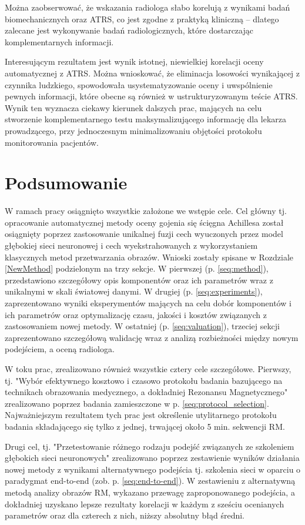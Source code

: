 Można zaobserwować, że wskazania radiologa słabo korelują z wynikami badań biomechanicznych oraz ATRS, co jest zgodne z praktyką kliniczną -- dlatego zalecane jest wykonywanie badań radiologicznych, które dostarczając komplementarnych informacji.

Interesującym rezultatem jest wynik istotnej, niewielkiej korelacji oceny automatycznej z ATRS. Można wnioskować, że eliminacja losowości wynikającej z czynnika ludzkiego, spowodowała usystematyzowanie oceny i uwspólnienie pewnych informacji, które obecne są również w ustrukturyzowanym teście ATRS. Wynik ten wyznacza ciekawy kierunek dalszych prac, mających na celu stworzenie komplementarnego testu maksymalizującego informację dla lekarza prowadzącego, przy jednoczesnym minimalizowaniu objętości protokołu monitorowania pacjentów.

\chapter{Podsumowanie}

W ramach pracy osiągnięto wszystkie założone we wstępie cele. Cel główny tj. opracowanie automatycznej metody oceny gojenia się ścięgna Achillesa został osiągnięty poprzez zastosowanie unikalnej fuzji cech wyuczonych przez model głębokiej sieci neuronowej i cech wyekstrahowanych z wykorzystaniem klasycznych metod przetwarzania obrazów. Wnioski zostały spisane w Rozdziale \ref{NewMethod} podzielonym na trzy sekcje. W pierwszej (p. \ref{seq:method}), przedstawiono szczegółowy opis komponentów oraz ich parametrów wraz z unikalnymi w skali światowej danymi. W drugiej (p. \ref{seq:experiments}), zaprezentowano wyniki eksperymentów mających na celu dobór komponentów i ich parametrów oraz optymalizację czasu, jakości i kosztów związanych z zastosowaniem nowej metody. W ostatniej (p. \ref{seq:valuation}), trzeciej sekcji zaprezentowano szczegółową walidację wraz z analizą rozbieżności między nowym podejściem, a oceną radiologa.

W toku prac, zrealizowano również wszystkie cztery cele szczegółowe. Pierwszy, tj. "Wybór efektywnego kosztowo i czasowo protokołu badania bazującego na technikach obrazowania medycznego, a dokładniej Rezonansu Magnetycznego" zrealizowano poprzez badania zamieszczone w p. \ref{seq:protocol_selection}. Najważniejszym rezultatem tych prac jest określenie utylitarnego protokołu badania składającego się tylko z jednej, trwającej około 5 min. sekwencji RM. 

Drugi cel, tj. "Przetestowanie różnego rodzaju podejść związanych ze szkoleniem głębokich sieci neuronowych" zrealizowano poprzez zestawienie wyników działania nowej metody z wynikami alternatywnego podejścia tj. szkolenia sieci w oparciu o paradygmat end-to-end (zob. p. \ref{seq:end-to-end}). W zestawieniu z alternatywną metodą analizy obrazów RM, wykazano przewagę zaproponowanego podejścia, a dokładniej uzyskano lepsze rezultaty korelacji w każdym z sześciu ocenianych parametrów oraz dla czterech z nich, niższy absolutny błąd średni.

